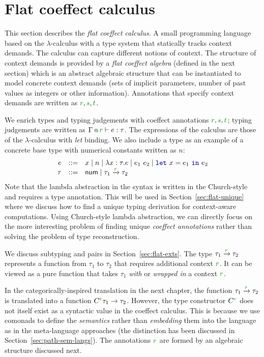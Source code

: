 \section{Flat coeffect calculus}
\label{sec:flat-calculus}

This section describes the \emph{flat coeffect calculus}. A small programming language based on the
$\lambda$-calculus with a type system that statically tracks context demands. The calculus can
capture different notions of context. The structure of context demands is provided by a
\emph{flat coeffect algebra} (defined in the next section) which is an abstract algebraic structure
that can be instantiated to model concrete context demands (sets of implicit parameters, number
of past values as integers or other information). Annotations that specify context demands are
written as $\cclrd{r}, \cclrd{s}, \cclrd{t}$.

We enrich types and typing judgements with coeffect annotations $\cclrd{r}, \cclrd{s}, \cclrd{t}$;
typing judgements are written as $\coctx{\Gamma}{\cclrd{r}}\vdash e:\tau$. The expressions of
the calculus are those of the $\lambda$-calculus with \emph{let} binding. We also include a type
 as an example of a concrete base type with numerical constants written as $n$:
%
\begin{equation*}
\begin{array}{rcl}
e &::=& x \sep n \sep \lambda x:\tau.e \sep e_1~e_2 \sep \kvd{let}~x = e_1~\kvd{in}~e_2\\
\tau &::=& \ident{num} \sep \tau_1 \xrightarrow{\cclrd{r}} \tau_2
\end{array}
\end{equation*}
%
Note that the lambda abstraction in the syntax is written in the Church-style and requires a type
annotation. This will be used in Section~\ref{sec:flat-unique} where we discuss how to find a
unique typing derivation for context-aware computations. Using Church-style lambda abstraction,
we can directly focus on the more interesting problem of finding unique \emph{coeffect annotations}
rather than solving the problem of type reconstruction.

We discuss subtyping and pairs in Section~\ref{sec:flat-exts}. The type $\tau_1 \xrightarrow{\cclrd{r}} \tau_2$
represents a function from $\tau_1$ to $\tau_2$ that requires additional context $\cclrd{r}$.
It can be viewed as a pure function that takes $\tau_1$ \emph{with} or \emph{wrapped in} a
context $\cclrd{r}$.

In the categorically-inspired translation in the next chapter, the function
$\tau_1 \xrightarrow{\cclrd{r}} \tau_2$ is translated into a function
$C^{\cclrd{r}} \tau_1 \rightarrow \tau_2$. However, the type constructor $C^{\cclrd{r}}$
does not itself exist as a syntactic value in the coeffect calculus. This is because we use
comonads to define the \emph{semantics} rather than \emph{embedding} them into the language as in
the meta-language approaches (the distinction has been discussed in Section~\ref{sec:path-sem-langs}).
The annotations $\cclrd{r}$ are formed by an algebraic structure discussed next.

